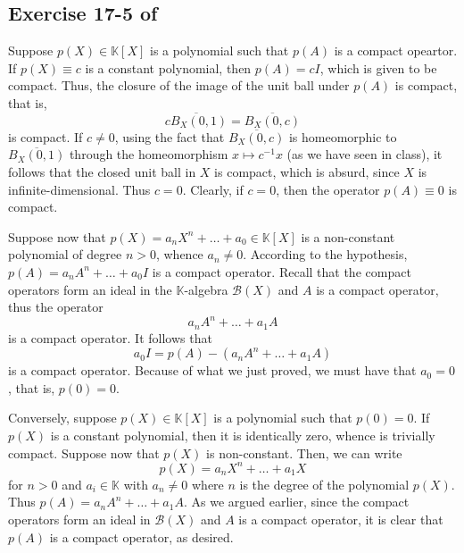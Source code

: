 \documentclass[10pt]{amsart}
\theoremstyle{thmstyle}
\theoremstyle{defstyle}
\newcommand{\K}{\mathbb{K}}
\newcommand{\scrB}{\mathscr B}
\begin{document}
\subsection*{Exercise 17-5 of \texorpdfstring{\cite{limaye-functional}}{[Lim14]}}

Suppose $p(X)\in\K[X]$ is a polynomial such that $p(A)$ is a compact opeartor. If $p(X)\equiv c$ is a constant polynomial, then $p(A) = cI$, which is given to be compact. Thus, the closure of the image of the unit ball under $p(A)$ is compact, that is,
\begin{equation*}
    \overline{cB_X(0, 1)} = \overline{B_X(0, c)} 
\end{equation*}
is compact. If $c\ne 0$, using the fact that $\overline{B_X(0, c)}$ is homeomorphic to $\overline{B_X(0, 1)}$ through the homeomorphism $x\mapsto c^{-1}x$ (as we have seen in class), it follows that the closed unit ball in $X$ is compact, which is absurd, since $X$ is infinite-dimensional. Thus $c = 0$. Clearly, if $c = 0$, then the operator $p(A)\equiv 0$ is compact.

Suppose now that $p(X) = a_nX^n + \dots + a_0\in\K[X]$ is a non-constant polynomial of degree $n > 0$, whence $a_n\ne 0$. According to the hypothesis, $p(A) = a_nA^n + \dots + a_0I$ is a compact operator. Recall that the compact operators form an ideal in the $\K$-algebra $\scrB(X)$ and $A$ is a compact operator, thus the operator 
\begin{equation*}
    a_nA^n + \dots + a_1A
\end{equation*}
is a compact operator. It follows that 
\begin{equation*}
    a_0I = p(A) - \left(a_nA^n + \dots + a_1A\right) 
\end{equation*}
is a compact operator. Because of what we just proved, we must have that $a_0 = 0$, that is, $p(0) = 0$.

Conversely, suppose $p(X)\in\K[X]$ is a polynomial such that $p(0) = 0$. If $p(X)$ is a constant polynomial, then it is identically zero, whence is trivially compact. Suppose now that $p(X)$ is non-constant. Then, we can write 
\begin{equation*}
    p(X) = a_nX^n + \dots + a_1X
\end{equation*}
for $n > 0$ and $a_i\in\K$ with $a_n\ne 0$ where $n$ is the degree of the polynomial $p(X)$. Thus $p(A) = a_nA^n + \dots + a_1A$. As we argued earlier, since the compact operators form an ideal in $\scrB(X)$ and $A$ is a compact operator, it is clear that $p(A)$ is a compact operator, as desired.



\end{document}
